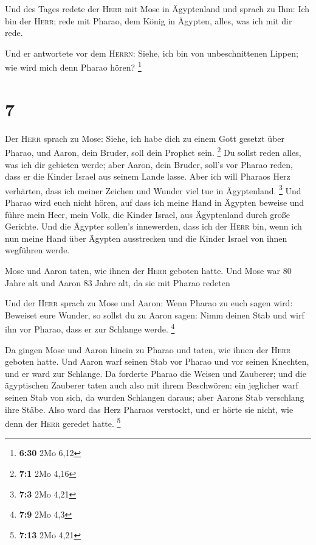  Und des Tages redete der \textsc{Herr} mit Mose in
Ägyptenland  und sprach zu Ihm: Ich bin der
\textsc{Herr}; rede mit Pharao, dem König in Ägypten, alles, was ich mit
dir rede.

 Und er antwortete vor dem \textsc{Herrn}: Siehe, ich bin
von unbeschnittenen Lippen; wie wird mich denn Pharao hören? \footnote{\textbf{6:30}
  2Mo 6,12}

\hypertarget{section-2}{%
\section{7}\label{section-2}}

 Der \textsc{Herr} sprach zu Mose: Siehe, ich habe dich zu
einem Gott gesetzt über Pharao, und Aaron, dein Bruder, soll dein
Prophet sein. \footnote{\textbf{7:1} 2Mo 4,16}  Du sollst
reden alles, was ich dir gebieten werde; aber Aaron, dein Bruder, soll's
vor Pharao reden, dass er die Kinder Israel aus seinem Lande lasse.
 Aber ich will Pharaos Herz verhärten, dass ich meiner
Zeichen und Wunder viel tue in Ägyptenland. \footnote{\textbf{7:3} 2Mo
  4,21}  Und Pharao wird euch nicht hören, auf dass ich
meine Hand in Ägypten beweise und führe mein Heer, mein Volk, die Kinder
Israel, aus Ägyptenland durch große Gerichte.  Und die
Ägypter sollen's innewerden, dass ich der \textsc{Herr} bin, wenn ich
nun meine Hand über Ägypten ausstrecken und die Kinder Israel von ihnen
wegführen werde.

 Mose und Aaron taten, wie ihnen der \textsc{Herr} geboten
hatte.  Und Mose war 80 Jahre alt und Aaron 83 Jahre alt,
da sie mit Pharao redeten

 Und der \textsc{Herr} sprach zu Mose und Aaron:
 Wenn Pharao zu euch sagen wird: Beweiset eure Wunder, so
sollst du zu Aaron sagen: Nimm deinen Stab und wirf ihn vor Pharao, dass
er zur Schlange werde. \footnote{\textbf{7:9} 2Mo 4,3}

 Da gingen Mose und Aaron hinein zu Pharao und taten, wie
ihnen der \textsc{Herr} geboten hatte. Und Aaron warf seinen Stab vor
Pharao und vor seinen Knechten, und er ward zur Schlange.
 Da forderte Pharao die Weisen und Zauberer; und die
ägyptischen Zauberer taten auch also mit ihrem Beschwören:
 ein jeglicher warf seinen Stab von sich, da wurden
Schlangen daraus; aber Aarons Stab verschlang ihre Stäbe.
 Also ward das Herz Pharaos verstockt, und er hörte sie
nicht, wie denn der \textsc{Herr} geredet hatte. \footnote{\textbf{7:13}
  2Mo 4,21}

